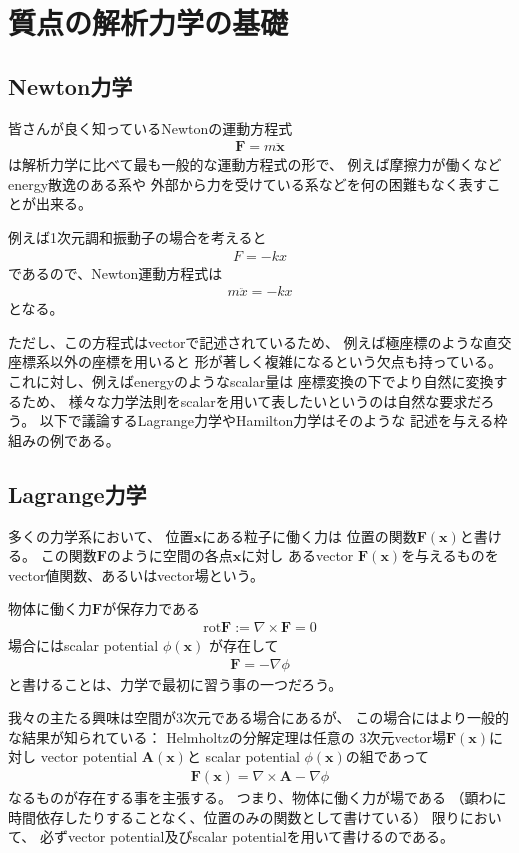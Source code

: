 \section{質点の解析力学の基礎}

\subsection{Newton力学}

皆さんが良く知っているNewtonの運動方程式
\begin{align}
  \bm{F} = m\ddot{\bm{x}}
\end{align}
は解析力学に比べて最も一般的な運動方程式の形で、
例えば摩擦力が働くなどenergy散逸のある系や
外部から力を受けている系などを何の困難もなく表すことが出来る。

例えば1次元調和振動子の場合を考えると
\begin{align}
  F = -k x
\end{align}
であるので、Newton運動方程式は
\begin{align}
  m\ddot{x} = - k x
\end{align}
となる。

ただし、この方程式はvectorで記述されているため、
例えば極座標のような直交座標系以外の座標を用いると
形が著しく複雑になるという欠点も持っている。
これに対し、例えばenergyのようなscalar量は
座標変換の下でより自然に変換するため、
様々な力学法則をscalarを用いて表したいというのは自然な要求だろう。
以下で議論するLagrange力学やHamilton力学はそのような
記述を与える枠組みの例である。

\subsection{Lagrange力学}

多くの力学系において、
位置$\bm{x}$にある粒子に働く力は
位置の関数$\bm{F}(\bm{x})$と書ける。
この関数$\bm{F}$のように空間の各点$\bm{x}$に対し
あるvector $\bm{F}(\bm{x})$を与えるものを
vector値関数、あるいはvector場という。

物体に働く力$\bm{F}$が保存力である
\begin{align}
  \mathrm{rot} \bm{F}
  := 
  \nabla \times \bm{F}
  = 0
\end{align}
場合にはscalar potential $\phi(\bm{x})$
が存在して
\begin{align}
  \bm{F} = -\nabla \phi
\end{align}
と書けることは、力学で最初に習う事の一つだろう。

我々の主たる興味は空間が3次元である場合にあるが、
この場合にはより一般的な結果が知られている：
Helmholtzの分解定理は任意の
3次元vector場$\bm{F}(\bm{x})$に対し
vector potential $\bm{A}(\bm{x})$と
scalar potential $\phi(\bm{x})$の組であって
\begin{align}
  \bm{F}(\bm{x}) = \nabla \times \bm{A} - \nabla \phi
\end{align}
なるものが存在する事を主張する。
つまり、物体に働く力が場である
（顕わに時間依存したりすることなく、位置のみの関数として書けている）
限りにおいて、
必ずvector potential及びscalar potentialを用いて書けるのである。

